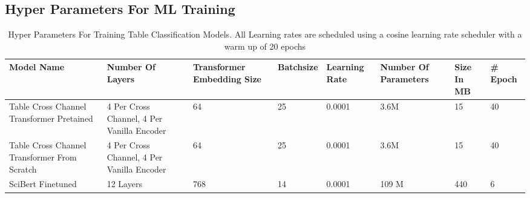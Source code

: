 \subsection{Hyper Parameters For ML Training}
\begin{table}
  \label{table\arabic{tablecounter}}
  \centering
  \begin{tabular}{|p{2cm}|p{3cm}|p{2cm}|p{2cm}|p{1.5cm}|p{1.5cm}|p{1cm}|p{1cm}|}
  \hline
      Model Name & Number Of Layers & Transformer Embedding Size & Batchsize & Learning Rate & Number Of Parameters & Size In MB & \# Epoch\\ \hline
      Table Cross Channel Transformer Pretained & 4 Per Cross Channel, 4 Per Vanilla Encoder & 64 & 25 & 0.0001 & 3.6M & 15 & 40\\ \hline
      Table Cross Channel Transformer From Scratch & 4 Per Cross Channel, 4 Per Vanilla Encoder & 64 & 25 & 0.0001 & 3.6M & 15 & 40\\ \hline
      SciBert Finetuned & 12 Layers & 768 & 14 & 0.0001 & 109 M & 440 & 6 \\ \hline
  \end{tabular}
  \caption{\label{tablecounter} Hyper Parameters For Training Table Classification Models. All Learning rates are scheduled using a cosine learning rate scheduler with a warm up of 20 epochs }
\end{table}
